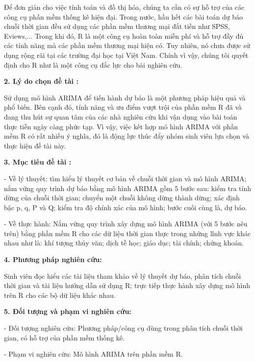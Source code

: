 Để đơn giản cho việc tính toán và đồ thị hóa, chúng ta cần có sự hỗ trợ của các công cụ phần mềm thống kê hiện đại. Trong nước, hầu hết các bài toán dự báo chuỗi thời gian đều sử dụng các phần mềm thương mại đắt tiền như SPSS, Eviews,... Trong khi đó, R là một công cụ hoàn toàn miễn phí và hỗ trợ đầy đủ các tính năng mà các phần mềm thương mại hiện có. Tuy nhiên, nó chưa được sử dụng rộng rãi tại các trường đại học tại Việt Nam. Chính vì vậy, chúng tôi quyết định cho R như là một công cụ đắc lực cho bài nghiên cứu.


\noindent 
{\bf 2. Lý do chọn đề tài :}

Sử dụng mô hình ARIMA để tiến hành dự báo là một phương pháp hiệu quả và phổ biến. Bên cạnh đó, tính năng và ưu điểm vượt trội của phần mềm R đã và đang thu hút sự quan tâm của các nhà nghiên cứu khi vận dụng vào bài toán thực tiễn ngày càng phức tạp. Vì vậy, việc kết hợp mô hình ARIMA với phần mềm R có rất nhiều ý nghĩa, đó là động lực thúc đẩy nhóm sinh viên lựa chọn và thực hiện đề tài này. 

\noindent 
{\bf 3. Mục tiêu đề tài :}

- Về lý thuyết: tìm hiểu lý thuyết cơ bản về chuỗi thời gian và mô hình ARIMA; nắm vững quy trình dự báo bằng mô hình ARIMA gồm 5 bước sau: kiểm tra tính dừng của chuỗi thời gian; chuyển một chuỗi không dừng thành dừng; xác định bậc p, q, P và Q; kiểm tra độ chính xác của mô hình; bước cuối cùng là, dự báo.

- Về thực hành: Nắm vững quy trình xây dựng mô hình ARIMA (với 5 bước nêu trên) bằng phần mềm R  cho các dữ liệu thời gian thực trong những lĩnh vực khác nhau như là: khí tượng thủy văn; dịch tễ học; giáo dục; tài chính; chứng khoán.

\noindent 
{\bf 4. Phương pháp nghiên cứu:}

Sinh viên đọc hiểu các tài liệu tham khảo về lý thuyết dự báo, phân tích chuỗi thời gian và tài liệu hướng dẫn sử dụng R; trực tiếp thực hành xây dựng mô hình trên R cho các bộ dữ liệu khác nhau.

\noindent 
{\bf 5. Đối tượng và phạm vi nghiên cứu:}

- Đối tượng nghiên cứu: Phương pháp/công cụ dùng trong phân tích chuỗi thời gian, có hỗ trợ của phần mềm thống kê. 

- Phạm vi nghiên cứu:  Mô hình ARIMA trên phần mềm R.
